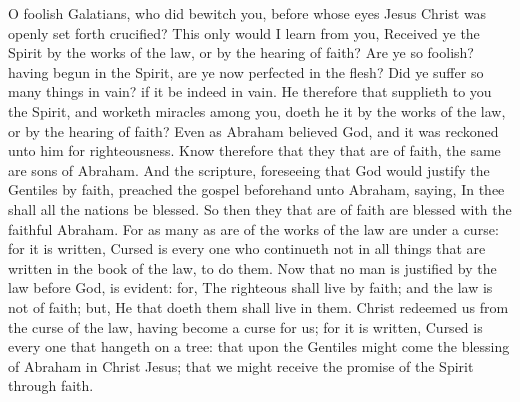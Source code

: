 


O foolish Galatians, who did bewitch you, before whose eyes Jesus Christ was openly set forth crucified? This only would I learn from you, Received ye the Spirit by the works of the law, or by the hearing of faith? Are ye so foolish? having begun in the Spirit, are ye now perfected in the flesh? Did ye suffer so many things in vain? if it be indeed in vain. He therefore that supplieth to you the Spirit, and worketh miracles among you, doeth he it by the works of the law, or by the hearing of faith? Even as Abraham believed God, and it was reckoned unto him for righteousness. Know therefore that they that are of faith, the same are sons of Abraham. And the scripture, foreseeing that God would justify the Gentiles by faith, preached the gospel beforehand unto Abraham, saying, In thee shall all the nations be blessed. So then they that are of faith are blessed with the faithful Abraham. For as many as are of the works of the law are under a curse: for it is written, Cursed is every one who continueth not in all things that are written in the book of the law, to do them. Now that no man is justified by the law before God, is evident: for, The righteous shall live by faith; and the law is not of faith; but, He that doeth them shall live in them. Christ redeemed us from the curse of the law, having become a curse for us; for it is written, Cursed is every one that hangeth on a tree: that upon the Gentiles might come the blessing of Abraham in Christ Jesus; that we might receive the promise of the Spirit through faith.  

